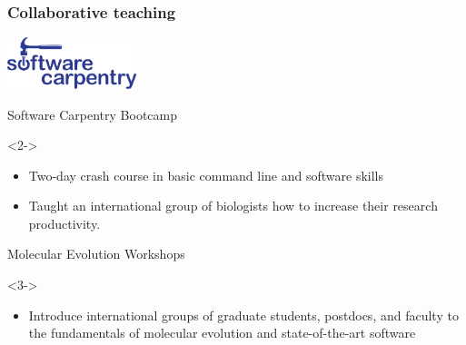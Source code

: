 \begin{frame}
    \frametitle{Collaborative teaching}
    \centerline{
    \includegraphics[height=1.5cm]{../images/software-carpentry.pdf}
    }
    Software Carpentry Bootcamp\\

    \begin{uncoverenv}<2->
    \begin{itemize}
        \item Two-day crash course in basic command line and software skills
        \item Taught an international group of biologists how to increase their
            research productivity.
    \end{itemize}
    \end{uncoverenv}
    
    Molecular Evolution Workshops\\

    \begin{uncoverenv}<3->
    \begin{itemize}
        \item Introduce international groups of graduate students, postdocs,
            and faculty to the fundamentals of molecular evolution and
            state-of-the-art software
    \end{itemize}
    \end{uncoverenv}
\end{frame}


